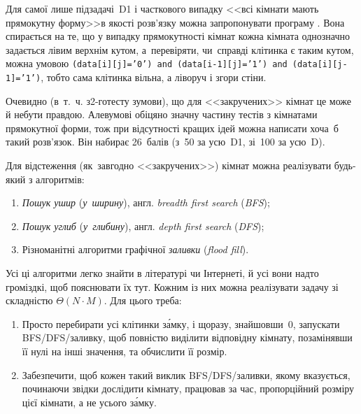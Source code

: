\Tutorial	
% 
Для самої лише підзадачі~D1 і часткового випадку <<всі кімнати мають прямокутну форму>>в якості розв'язку можна запропонувати програму .
Вона спирається на те, що у випадку прямокутності кімнат кожна кімната однозначно задається лівим верхнім кутом, а~перевіряти, чи~справді клітинка є таким кутом, можна умовою \texttt{\mbox{(data[i][j]='0')} \mbox{and} \mbox{(data[i-1][j]='1')} \mbox{and} \mbox{(data[i][j-1]='1')}}, тобто сама клітинка вільна, а ліворуч і згори стіни.
\ifAfour\else\par\fi
Очевидно (в~т.~ч. з\nolinebreak[3] \mbox{2-го}\nolinebreak[3] тесту з\nolinebreak[3] умови), що для <<закручених>> кімнат це може й не\nolinebreak[3] бути правдою. Але\nolinebreak[2] в\nolinebreak[3] умові обіцяно значну частину тестів з кімнатами прямокутної форми, тож при відсутності кращих ідей можна написати хоча~б такий розв’язок. Він набирає 26~балів (з~50 за усю~D1, зі~100 за усю~D).



Для відстеження (як~завгодно <<закручених>>) кімнат можна реалізувати будь-який з алгоритмів:

\begin{enumerate}

\item	
\emph{Пошук ушир} (\emph{у~ширину}), англ. \emph{breadth first search} (\emph{BFS});

\item
\emph{Пошук углиб} (\emph{у~глибину}), англ. \emph{depth first search} (\emph{DFS});

\item
Різноманітні алгоритми графічної \emph{заливки} (\emph{flood fill}).

\end{enumerate}


Усі ці алгоритми легко знайти в літературі чи Інтернеті, й усі вони надто громіздкі, щоб пояснювати їх тут. Кожним із них можна реалізувати задачу зі складністю $\Theta(N{\cdot}M)$. Для цього треба:
\begin{enumerate}
\item
Просто перебирати усі клітинки з\'{а}мку, і щоразу, знайшовши~0, запускати BFS/DFS/заливку, щоб повністю виділити відповідну кімнату, позамінявши її нулі на інші значення, та обчислити її розмір.

\vspace{0.125pt plus 2pt}
\item
Забезпечити, щоб кожен такий виклик BFS/DFS/заливки, якому вказується, починаючи звідки дослідити кімнату, працював за час, пропорційний розміру цієї кімнати, а не усього з\'{а}мку.

\end{enumerate}


